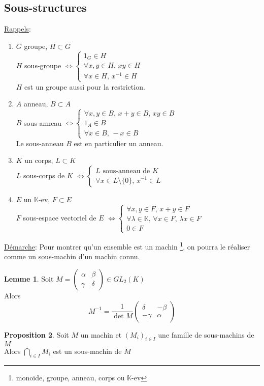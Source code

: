 \documentclass[10pt,a4paper]{article}
\theoremstyle{definition}
\newtheorem{proposition}{Proposition}[section]
\newtheorem{lemme}[proposition]{Lemme}
\begin{document}
\subsection{Sous-structures}
\noindent \uline{Rappels}:
\begin{enumerate}
\item $G$ groupe, $H \subset G$ \\
$H$ sous-groupe $\iff \begin{cases}
1_G \in H \\
\forall x, y \in H,\, xy \in H \\
\forall x \in H,\, x^{-1} \in H
\end{cases}$ \\
$H$ est un groupe aussi pour la restriction.
\item $A$ anneau, $B \subset A$ \\
$B$ sous-anneau $\iff \begin{cases}
\forall x, y \in B,\, x + y \in B,\, xy \in B \\
1_A \in B \\
\forall x \in B,\, -x \in B
\end{cases}$ \\
Le sous-anneau $B$ est en particulier un anneau.
\item $K$ un corps, $L \subset K$ \\
$L$ sous-corps de $K$ $\iff \begin{cases}
L \text{ sous-anneau de } K \\
\forall x \in L \setminus \{ 0 \},\, x^{-1} \in L
\end{cases}$
\item $E$ un $\mathbb{K}$-ev, $F \subset E$ \\
$F$ sous-espace vectoriel de $E$ $\iff \begin{cases}
\forall x, y \in F,\, x + y \in F \\
\forall \lambda \in \mathbb{K},\, \forall x \in F,\, \lambda x \in F \\
0 \in F
\end{cases}$
\end{enumerate} \medskip

\noindent \uline{Démarche}: Pour montrer qu'un ensemble est un machin \footnote{monoïde, groupe, anneau, corps ou $\mathbb{K}$-ev}, on pourra le réaliser comme un sous-machin d'un machin connu.

\begin{lemme}
Soit $M = \begin{pmatrix}
\alpha & \beta \\
\gamma & \delta
\end{pmatrix} \in GL_2(K)$ \\
Alors
\[ M^{-1} = \frac{1}{\det M} \begin{pmatrix}
\delta & - \beta \\
- \gamma & \alpha
\end{pmatrix}\]
\end{lemme}
\begin{proposition}
Soit $M$ un machin \footnotemark[1] et $(M_i)_{i \in I}$ une famille de sous-machins de $M$ \\
Alors $\bigcap\limits_{i \in I} M_i$ est un sous-machin de $M$
\end{proposition}
\end{document}

